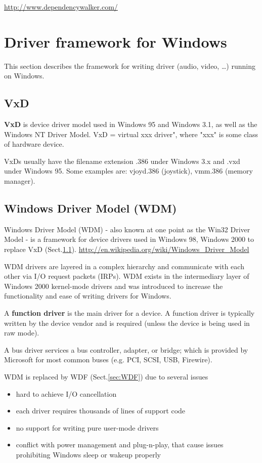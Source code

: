 \url{http://www.dependencywalker.com/}

\section{Driver framework for Windows}

This section describes the framework for writing driver (audio, video, \ldots) running on Windows.

\subsection{VxD}
\label{sec:VxD}

 {\bf VxD} is device driver model used in Windows 95 and Windows 3.1, as well as
 the Windows NT Driver Model.
 VxD = virtual xxx driver", where "xxx" is some class of hardware device.
 
 VxDs usually have the filename extension .386 under Windows 3.x and .vxd under Windows 95.
 Some examples are: vjoyd.386 (joystick), vmm.386 (memory manager). 

\subsection{Windows Driver Model (WDM)}
\label{sec:WDM}

Windows Driver Model (WDM) - also known at one point as the Win32 Driver Model - is a framework for device drivers 
used in Windows 98, Windows 2000 to replace VxD (Sect.\ref{sec:VxD}).
\url{http://en.wikipedia.org/wiki/Windows_Driver_Model}

WDM drivers are layered in a complex hierarchy and communicate with each other
via I/O request packets (IRPs).
WDM exists in the intermediary layer of Windows 2000 kernel-mode drivers and was
introduced to increase the functionality and ease of writing drivers for
Windows.

A {\bf function driver} is the main driver for a device. A function driver is typically written by the device vendor and is required (unless the device is being used in raw mode).


A bus driver services a bus controller, adapter, or bridge; which is provided by
Microsoft for most common buses (e.g. PCI, SCSI, USB, Firewire).

WDM is replaced by WDF (Sect.\ref{sec:WDF}) due to several issues
\begin{itemize}
  \item hard to achieve I/O cancellation
  \item each driver requires thousands of lines of support code
  \item no support for writing pure user-mode drivers
  \item conflict with power management and plug-n-play, that cause issues prohibiting Windows sleep or wakeup
  properly 
\end{itemize}

